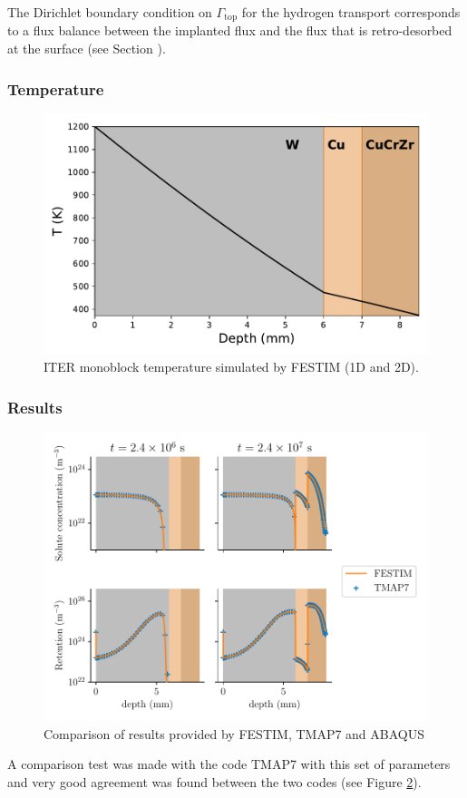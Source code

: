 The Dirichlet boundary condition on $\Gamma_\mathrm{top}$ for the hydrogen transport corresponds to a flux balance between the implanted flux and the flux that is retro-desorbed at the surface (see Section \label{triangle model}).

\subsubsection{Temperature}
\begin{figure}
    \centering
    \includegraphics[width=0.5\linewidth]{Figures/Chapter3/monoblocks/interface_condition/iter case/temperature_1D.pdf}
    \caption{ITER monoblock temperature simulated by FESTIM (1D and 2D).}
    \label{fig: temperature}
\end{figure}


\subsubsection{Results}
\begin{figure}
    \centering
    \includegraphics[width=\linewidth]{Figures/Chapter3/monoblocks/interface_condition/iter case/comparison_codes.pdf}
    \caption{Comparison of results provided by FESTIM, TMAP7 and ABAQUS}
    \label{fig: code comparison}
\end{figure}

A comparison test was made with the code TMAP7 with this set of parameters and very good agreement was found between the two codes (see Figure \ref{fig: code comparison}).
